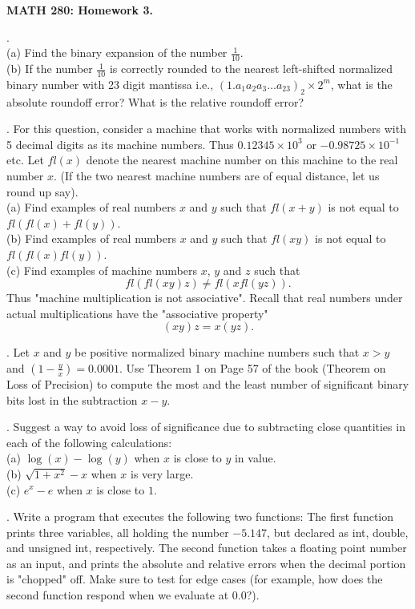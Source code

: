 \documentclass[12 pt]{article}
\begin{document}
\centerline{\bf MATH 280: Homework 3. }

\bigskip

. \\
(a) Find the binary expansion of the number $\frac{1}{10}$. \\
(b) If the number $\frac{1}{10}$ is correctly rounded to the nearest 
left-shifted normalized binary number with 23 digit mantissa i.e., 
$(1.a_1a_2a_3 \dots a_{23})_2 \times 2^m$, what is the absolute 
roundoff error? What is the relative roundoff error?

\medskip

. For this question, consider a machine that works with normalized numbers with 5 decimal digits as its machine numbers. 
Thus $0.12345 \times 10^3$ or $-0.98725 \times 10^{-1}$ etc. Let $fl(x)$ denote the nearest machine number on this machine to the real number $x$. 
(If the two nearest machine numbers are of equal distance, let us round up say). \\
(a) Find examples of real numbers $x$ and $y$ such that $fl(x+y)$ is not equal to $fl(fl(x)+fl(y))$. \\
(b) Find examples of real numbers $x$ and $y$ such that $fl(xy)$ is not equal to $fl(fl(x) fl(y))$. \\
(c) Find examples of machine numbers $x$, $y$ and $z$ such that $$fl(fl(xy) z) \neq fl(x fl(yz)).$$Thus "machine multiplication is not associative". 
Recall that real numbers under actual multiplications have the "associative property" $$(xy)z=x(yz).$$



\medskip


. Let $x$ and $y$ be positive normalized binary machine numbers such that $x > y$ and $(1-\frac{y}{x}) = 0.0001$. Use Theorem 1 on Page 57 of the book 
(Theorem on Loss of Precision) to compute the most and the least number of significant binary bits lost in the subtraction $x-y$.

\medskip

. Suggest a way to avoid loss of significance due to subtracting close quantities in each of the following calculations: \\
(a) $\log(x)-\log(y)$  when $x$ is close to $y$ in value. \\
(b) $\sqrt{1+x^2} - x$ when $x$ is very large. \\
(c) $e^x - e$ when $x$ is close to $1$. 

\medskip

. Write a program that executes the following two functions: The first function prints three variables, all holding the number $-5.147$, but declared as int, double, and unsigned int, respectively. The second function takes a floating point number as an input, and prints the absolute and relative errors when the decimal portion is "chopped" off. Make sure to test for edge cases (for example, how does the second function respond when we evaluate at $0.0$?). 
 
\end{document}
